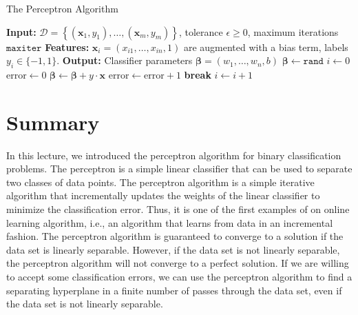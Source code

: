 \documentclass{article}[12pt]
\begin{document}
\begin{algorithm}[H]
    \caption{The Perceptron Algorithm}\label{alg:perceptron}
    \begin{algorithmic}[1]
        \State \textbf{Input:} $\mathcal{D} = \left\{(\mathbf{x}_{1},y_{1}),\dotsc,(\mathbf{x}_{m},y_{m})\right\}$, tolerance $\epsilon\geq{0}$, maximum iterations $\texttt{maxiter}$
        \State \textbf{Features:} $\mathbf{x}_{i} = \left(x_{i1},\dots, x_{in},1\right)$ are augmented with a bias term, labels $y_{i}\in\{-1,1\}$.
        \State \textbf{Output:} Classifier parameters $\mathbf{\beta} = \left(w_{1},\dots, w_{n}, b\right)$
        \State $\mathbf{\beta} \gets \texttt{rand}$
        \State $i \gets 0$
        \State $\text{error} \gets 0$
                \State $\mathbf{\beta} \gets \mathbf{\beta} + {y}\cdot\mathbf{x}$
                \State $\text{error} \gets \text{error} + 1$
            \EndIf
        \EndFor
            \State \textbf{break}     
        \EndIf
        \State $i \gets i + 1$
        \EndWhile
    \end{algorithmic}
\end{algorithm}

\section{Summary}
In this lecture, we introduced the perceptron algorithm for binary classification problems.
The perceptron is a simple linear classifier that can be used to separate two classes of data points.
The perceptron algorithm is a simple iterative algorithm that incrementally updates the weights of the linear classifier to minimize the classification error.
Thus, it is one of the first examples of on online learning algorithm, i.e., an algorithm that learns from data in an incremental fashion.
The perceptron algorithm is guaranteed to converge to a solution if the data set is linearly separable.
However, if the data set is not linearly separable, the perceptron algorithm will not converge to a perfect solution.
If we are willing to accept some classification errors, we can use the perceptron algorithm to find a separating hyperplane in a finite number of passes through the data set, 
even if the data set is not linearly separable.


\end{document}
